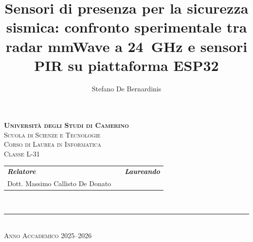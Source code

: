 %

\author{Stefano De Bernardinis}
\title{Sensori di presenza per la sicurezza sismica: confronto
sperimentale tra radar mmWave a 24~GHz e sensori PIR su piattaforma ESP32}

\makeatletter
\newcommand{\TitleText}{\@title}
\makeatother

\begin{fullwidth}
\begin{titlingpage}
\setlength{\hoffset}{26pt}%
  \begin{center}
    \LARGE{\textsc{\textbf{Universit\`a degli Studi di Camerino}}}\\
    \vspace{0.3em}
    \large{\textsc{Scuola di Scienze e Tecnologie}}\\
    \vspace{0.3em}
    \textsc{\large{Corso di Laurea in Informatica \\ Classe L-31}}\\
    \vspace{0.3em}
    \vspace{4em}
    \vspace{2em}
    \textbf{\LARGE\thetitle}
    \vspace{5em}
    \vspace{-.75cm}
    \begin{tabular}{p{220pt}p{35pt}p{130pt}}
      \normalsize{\textit{\textbf{Relatore}}\vspace{0.3em}} &&
        \normalsize{\textit{\textbf{Laureando}}} \\
      \normalsize{Dott. Massimo Callisto De Donato\vspace{1.3em}} &&
        \theauthor{}\\
    \end{tabular}\\
    \vspace{1.2em} \vfill
    \newlength{\rigatitolo}
    \rule{\rigatitolo}{.5pt}\\
    \large{\textsc{Anno Accademico 2025--2026}}
  \end{center}
  \thispagestyle{empty}
\setlength{\hoffset}{0pt}
\end{titlingpage}
\end{fullwidth}

